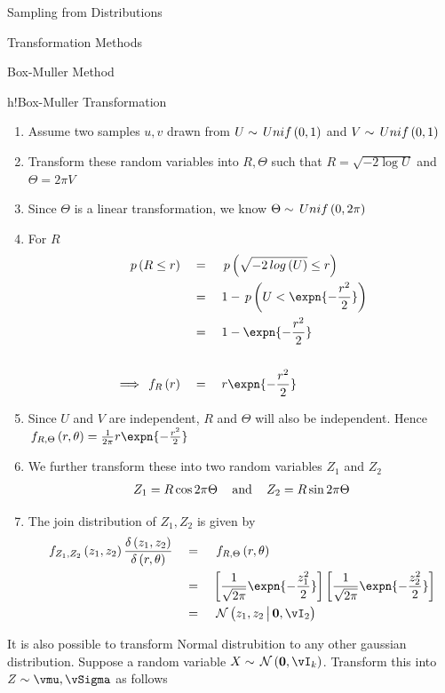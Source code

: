\documentclass{article}
\begin{document}
\begin{ssection}{Sampling from Distributions}
\begin{ssubsection}{Transformation Methods}
\begin{sssubsection}{Box-Muller Method}
\begin{algo}{h!}{Box-Muller Transformation}
				\begin{enumerate}
					\item Assume two samples $u, v$ drawn from $U \sim \func{Unif}{0, 1}$ and $V \sim \func{Unif}{0, 1}$
					\item Transform these random variables into $R, \Theta$ such that $R = \sqrt{-2 \log{U}}$ and $\Theta = 2 \pi V$
					\item Since $\Theta$ is a linear transformation, we know $\Theta \sim \func{Unif}{0, 2 \pi}$
					\item For $R$
						\begin{align*}
							\prob{R \le r}			&\eq \prob{\sqrt{-2 \log{U}} \le r} \\
													&\eq 1 - \prob{U < \expn{- \frac{r^2}{2}}} \\
													&\eq 1 - \expn{- \frac{r^2}{2}} \\
							\\
							\implies \func[R]{f}{r}	&\eq r \expn{- \frac{r^2}{2}}
						\end{align*}
					\item Since $U$ and $V$ are independent, $R$ and $\Theta$ will also be independent. Hence $\func[R, \Theta]{f}{r, \theta} = \frac{1}{2 \pi} r \expn{- \frac{r^2}{2}}$
					\item We further transform these into two random variables $Z_1$ and $Z_2$
						\begin{align*}
							Z_1 = R \cos{2 \pi \Theta} && \,\text{and}\, && Z_2 = R \sin{2 \pi \Theta}
						\end{align*}
					\item The join distribution of $Z_1, Z_2$ is given by
						\begin{align*}
							\func[Z_1, Z_2]{f}{z_1, z_2} \derp{z_1, z_2}{r, \theta}	&\eq \func[R, \Theta]{f}{r, \theta} \\
																					&\eq \brac{\frac{1}{\sqrt{2 \pi}} \expn{- \frac{z_1^2}{2}}} \brac{\frac{1}{\sqrt{2 \pi}} \expn{- \frac{z_2^2}{2}}} \\
																					&\eq \ND{z_1, z_2 \pipe \vzero, \iden{2}}
						\end{align*}
				\end{enumerate}

			\end{algo}

			\clearpage

			It is also possible to transform Normal distrubition to any other gaussian distribution. Suppose a random variable $X \sim \ND{\vzero, \iden{k}}$. Transform this into $Z \sim{\vmu, \vSigma}$ as follows


\end{sssubsection}
\end{ssubsection}
\end{ssection}
\end{document}
